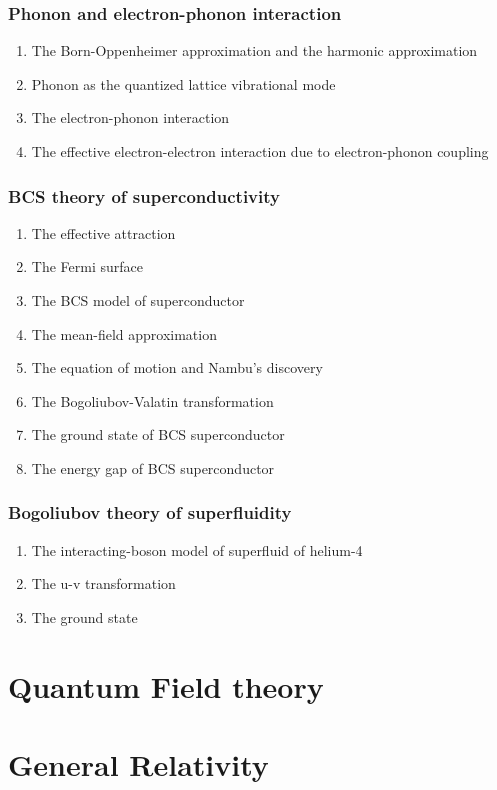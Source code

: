 \documentclass[12pt]{article}
\numberwithin{equation}{section}
\begin{document}
\subsubsection{Phonon and electron-phonon interaction}
\begin{enumerate}
\item The Born-Oppenheimer approximation and the harmonic approximation
\item Phonon as the quantized lattice vibrational mode
\item The electron-phonon interaction
\item The effective electron-electron interaction due to electron-phonon coupling
\end{enumerate}
\subsubsection{BCS theory of superconductivity}
\begin{enumerate}
\item The effective attraction
\item The Fermi surface
\item The BCS model of  superconductor
\item The mean-field approximation
\item The equation of motion and Nambu's discovery
\item The Bogoliubov-Valatin transformation
\item The ground state of BCS superconductor
\item The energy gap of BCS superconductor
\end{enumerate}
\subsubsection{Bogoliubov theory of superfluidity}
\begin{enumerate}
\item The interacting-boson model of superfluid of helium-4
\item The u-v transformation
\item The ground state
\end{enumerate}                     
\section{Quantum Field theory}

\section{General Relativity}
\end{document}
